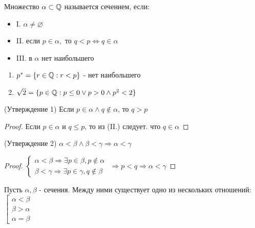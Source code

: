 \begin{definition}
    
    Множество $\alpha \subset \mathbb{Q}$ называется сечением, если:
    \begin{itemize}
        \item I. $\alpha \neq \varnothing$
        \item II. если $p \in \alpha, $ то $q < p \Leftrightarrow q \in \alpha$
        \item III. в $\alpha$ нет наибольшего
    \end{itemize}
\end{definition}

\begin{eg}
    \begin{enumerate}
        \item $p^* = \{r \in \mathbb{Q}: r < p\}$ - нет наибольшего
        \item $\sqrt{2} = \{p \in \mathbb{Q}: p \leq 0 \lor p > 0 \land p^2 < 2\}$ 
    \end{enumerate}
\end{eg}

\begin{theorem} (Утверждение 1)
    \label{Statement1}
    Если $p \in \alpha \land q \notin \alpha$, то $ q > p$
\end{theorem}

\begin{proof}
    Если $p \in \alpha$ и $q \leq p$, то из (II.) следует. что $q \in \alpha$
\end{proof}

\begin{theorem} (Утверждение 2)
    $\alpha < \beta \land \beta < \gamma \Rightarrow \alpha < \gamma$
\end{theorem}

\begin{proof}
    $\begin{cases}
        \alpha < \beta \Rightarrow \exists p \in \beta, p \notin \alpha \\
        \beta < \gamma \Rightarrow \exists p \in \gamma, q \notin \beta
    \end{cases}$
    $\Rightarrow p < q \Rightarrow \alpha < \gamma$
\end{proof}

\begin{theorem}
    Пусть $\alpha, \beta$ - сечения. Между ними существует одно из нескольких отношений:
    $\left[ 
        \begin{gathered} 
        \alpha < \beta \\ 
        \beta > \alpha \\
        \alpha = \beta 
        \end{gathered} 
    \right.$
\end{theorem}

